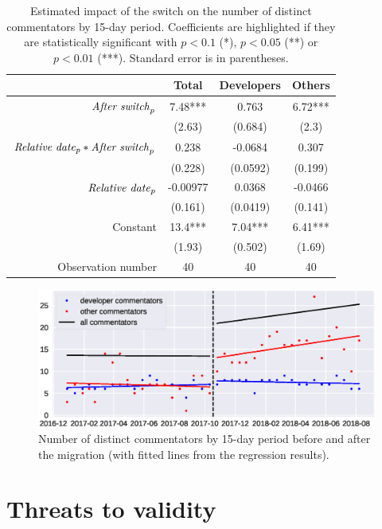 \documentclass[runningheads]{llncs}
\begin{document}
\begin{table}
\centering
\caption{Estimated impact of the switch on the number of distinct commentators by 15-day period. Coefficients are highlighted if they are statistically significant with $p<0.1$ (*), $p<0.05$ (**) or $p<0.01$ (***). Standard error is in parentheses.}\label{tab:commentators}
\begin{tabular}{|r|c|c|c|}
\hline
&  Total & Developers & Others \\
\hline
$\mbox{\emph{After switch}}_p$ & 7.48*** & 0.763 & 6.72*** \\
& (2.63) & (0.684) & (2.3) \\
\hline
$\mbox{\emph{Relative date}}_p * \mbox{\emph{After switch}}_p$ & 0.238 & -0.0684 & 0.307 \\
& (0.228) & (0.0592) & (0.199) \\
\hline
$\mbox{\emph{Relative date}}_p$ & -0.00977 & 0.0368 & -0.0466 \\
& (0.161) & (0.0419) & (0.141) \\
\hline
Constant & 13.4*** & 7.04*** & 6.41*** \\
& (1.93) & (0.502) & (1.69) \\
\hline
Observation number & 40 & 40 & 40 \\
\hline
\end{tabular}
\end{table}


\begin{figure}
\includegraphics[width=\textwidth]{commentator_nb_rd.eps}
\caption{Number of distinct commentators by 15-day period before and after the migration (with fitted lines from the regression results).} \label{commentator_nb_rd}
\end{figure}

\section{Threats to validity}
\end{document}
